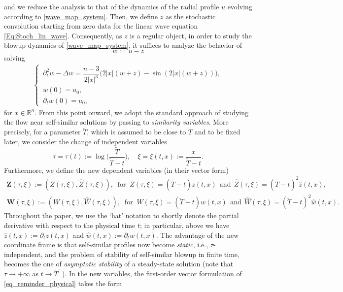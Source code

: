 \documentclass[12pt,reqno]{amsart}
\theoremstyle{plain}
\theoremstyle{remark}
\theoremstyle{plain}
\theoremstyle{definition}
\numberwithin{equation}{section}
\numberwithin{equation}{section}
\def\R{{\mathbb R}}
\begin{document}
	and \cite[Lemma A.5]{glogic2022stable} we reduce the analysis to that of the dynamics of the radial profile $u$ evolving according to \eqref{wave_map_system}. Then, we define $z$ as the stochastic convolution starting from zero data for the linear wave equation \eqref{Eq:Stoch_lin_wave}. Consequently, as $z$ is a regular object, in order to study the blowup dynamics of \eqref{wave_map_system}, it suffices to analyze the behavior of
	\begin{equation}\label{Def:z}
		w := u - z
	\end{equation}
	 solving
	\begin{align}\label{eq_reminder_physical}
		\begin{cases}
			\,\partial_t^2 w-\Delta w=\dfrac{n-3}{2\lvert x\rvert^3}\big(2\lvert x\rvert (w+z)-\sin (2\lvert x\rvert (w+z))\big),\\
			\, w(0)= u_0,\\
			\, \partial_t w(0)=\hat{u}_{0},   
		\end{cases}
	\end{align}
	for  $x \in \R^n$. From this point onward, we adopt the standard approach of studying the flow near self-similar solutions by passing to \emph{similarity variables}. More precisely, for a parameter $\tilde{T}$, which is assumed to be close to $T$ and to be fixed later, we consider the change of independent variables
	\begin{equation*}
		\tau=\tau(t):=\log\bigg(\frac{\tilde{T}}{\tilde{T}-t}\bigg), \quad \xi=\xi(t,x):=\frac{x}{\tilde{T}-t}.
	\end{equation*}
	Furthermore, we define the new dependent variables (in their vector form)
	\begin{gather*}
		\mathbf{Z}(\tau,\xi):=(Z(\tau,\xi),\hat{Z}(\tau,\xi)), \;\; \text{for} \;\; Z(\tau,\xi)=(\tilde{T}-t)z(t,x) \;\, \text{and} \;\, \hat{Z}(\tau,\xi)=(\tilde{T}-t)^2\hat{z}(t,x),\\
		{\mathbf{W}}(\tau,\xi):=(W(\tau,\xi),\hat{W}(\tau,\xi)), \;\; \text{for} \;\; W(\tau,\xi)=(\tilde{T}-t)w(t,x) \;\, \text{and} \;\, \hat{W}(\tau,\xi)=(\tilde{T}-t)^2\hat{w}(t,x).
	\end{gather*}
	Throughout the paper, we use the `hat' notation to shortly denote the partial derivative with respect to the physical time $t$; in particular, above we have  $\hat{z} (t,x):=\partial_tz(t,x)$ and $\hat{w}(t,x):=\partial_tw(t,x)$.
	The advantage of the new coordinate frame is that  self-similar profiles now become \emph{static}, i.e., $\tau$-independent, and the problem of stability of self-similar blowup in finite time, becomes the one of \emph{asymptotic stability} of a steady-state solution (note that $\tau \rightarrow +\infty$ as $t \rightarrow \tilde{T}^-$).  In the new variables, the first-order vector formulation of \eqref{eq_reminder_physical} takes the form
\end{document}
